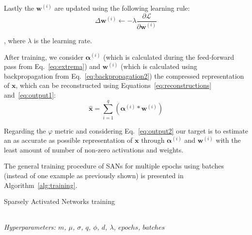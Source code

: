\documentclass[journal]{IEEEtran}
\begin{document}
Lastly the $\bm{w}^{(i)}$ are updated using the following learning rule:
\begin{equation}
	\label{eq:backpropagation2}
	\Delta\bm{w}^{(i)} \leftarrow -\lambda\frac{\partial\mathcal{L}}{\partial\bm{w}^{(i)}}
\end{equation}

\noindent
, where $\lambda$ is the learning rate.

After training, we consider $\bm{\alpha}^{(i)}$ (which is calculated during the feed-forward pass from Eq.~\ref{eq:extrema}) and $\bm{w}^{(i)}$ (which is calculated using backpropagation from Eq.~\ref{eq:backpropagation2}) the compressed representation of $\bm{x}$, which can be reconstructed using Equations~\ref{eq:reconstructions} and~\ref{eq:output1}:
\begin{equation}
	\label{eq:output2}
	\hat{\bm{x}} = \sum\limits_{i=1}^q \left(\bm{\alpha}^{(i)} * \bm{w}^{(i)}\right)
\end{equation}

Regarding the $\varphi$ metric and considering Eq.~\ref{eq:output2} our target is to estimate an as accurate as possible representation of $\bm{x}$ through $\bm{\alpha}^{(i)}$ and $\bm{w}^{(i)}$ with the least amount of number of non-zero activations and weights.

The general training procedure of SANs for multiple epochs using batches (instead of one example as previously shown) is presented in Algorithm~\ref{alg:training}.

\begin{algorithm}[H]
	\caption{Sparsely Activated Networks training}\label{alg:training}
	\begin{algorithmic}[1]
		\renewcommand{\algorithmicrequire}{\textbf{Input:}}
		\renewcommand{\algorithmicensure}{\textbf{Output:}}
		\\ \textit{Hyperparameters:  $m$, $\mu$, $\sigma$, $q$, $\phi$, $d$, $\lambda$, $epochs$, $batches$}
		\ENDFOR{}
		\ENDFOR{}
		\ENDFOR{}
		\ENDFOR{}
	\end{algorithmic}
\end{algorithm}
\end{document}
